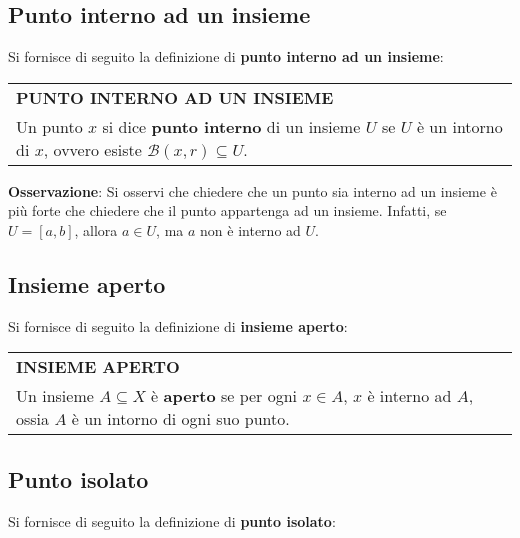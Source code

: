 \documentclass[a4paper]{extarticle}
\renewcommand\arraystretch{}
\begin{document}
\subsection{Punto interno ad un insieme}
Si fornisce di seguito la definizione di \textbf{punto interno ad un insieme}:

\vspace{1em}
\setlength{\tabcolsep}{14pt}
\renewcommand{\arraystretch}{2}
\noindent
\begin{tabularx}{\textwidth}{@{}|P|@{}}
    \hline
    {\textbf{PUNTO INTERNO AD UN INSIEME}}\\
    \parbox{\linewidth}{Un punto $x$ si dice \textbf{punto interno} di un insieme $U$ se $U$ è un intorno di $x$, ovvero esiste $\mathcal{B}(x,r) \subseteq U$. \vspace{3mm}}\\
    \hline
\end{tabularx}

\vspace{1em}
\noindent
\textbf{Osservazione}: Si osservi che chiedere che un punto sia interno ad un insieme è più forte che chiedere che il punto appartenga ad un insieme. Infatti, se $U = [a,b]$, allora $a \in U$, ma $a$ non è interno ad $U$.

\vspace{1em}
\noindent
\subsection{Insieme aperto}
Si fornisce di seguito la definizione di \textbf{insieme aperto}:

\vspace{1em}
\setlength{\tabcolsep}{14pt}
\renewcommand{\arraystretch}{2}
\noindent
\begin{tabularx}{\textwidth}{@{}|P|@{}}
    \hline
    {\textbf{INSIEME APERTO}}\\
    \parbox{\linewidth}{Un insieme $A \subseteq X$ è \textbf{aperto} se per ogni $x \in A$, $x$ è interno ad $A$, ossia $A$ è un intorno di ogni suo punto. \vspace{1mm}}\\
    \hline
\end{tabularx}

\vspace{1em}
\noindent
\subsection{Punto isolato}
Si fornisce di seguito la definizione di \textbf{punto isolato}:
\end{document}
